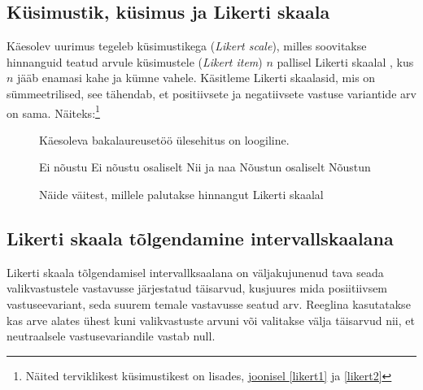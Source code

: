 \documentclass[a4paper,12pt,oneside]{article}
\numberwithin{equation}{section}
\theoremstyle{definition}
\begin{document}
\subsection{Küsimustik, küsimus ja Likerti skaala}

Käesolev uurimus tegeleb k\"usimustikega (\textit{Likert scale}),  milles soovitakse hinnanguid teatud arvule küsimustele (\textit{Likert item}) $n$ pallisel Likerti skaalal \cite{Edmondson}, kus $n$ jääb enamasi kahe ja kümne vahele.  Käsitleme Likerti skaalasid, mis on sümmeetrilised, see tähendab, et positiivsete ja negatiivsete vastuse variantide arv on sama. Näiteks:\footnote{Näited terviklikest k\"usimustikest on lisades, \hyperref[likert1]{joonisel \ref*{likert1}} ja \hyperref[likert2]{ \ref*{likert2}}}

\vspace{10pt}

\begin{figure}[H]


\colorbox{background_example}{\parbox{\textwidth}{

\vspace{1mm}

Käesoleva bakalaureusetöö \"ulesehitus on loogiline.

\vspace{5pt}

\begin{Form}
\def\DefaultWidthofChoiceMenu{12pt}%


\small{
	\CheckBox[bordercolor = gray,name=optionE]{\mbox{}} Ei nõustu 
	\CheckBox[bordercolor = gray,name=optionD]{\mbox{}} Ei nõustu osaliselt
	\CheckBox[bordercolor = gray,name=optionC]{\mbox{}} Nii ja naa
	\CheckBox[bordercolor = gray,name=optionC]{\mbox{}}  Nõustun osaliselt
	\CheckBox[checked,bordercolor = gray,name=optionC]{\mbox{}} Nõustun
}


\end{Form}}}
\caption{Näide väitest, millele palutakse hinnangut Likerti skaalal}
\label{likert_question}
\end{figure}

\subsection{Likerti skaala tõlgendamine intervallskaalana}

Likerti skaala tõlgendamisel intervallksaalana on väljakujunenud tava seada valikvastustele vastavusse järjestatud täisarvud, kusjuures mida posiitiivsem vastuseevariant, seda suurem temale vastavusse seatud arv. Reeglina kasutatakse kas arve alates ühest kuni valikvastuste arvuni või valitakse välja täisarvud nii, et neutraalsele vastusevariandile vastab null.
\end{document}
